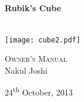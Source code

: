 \begin{titlepage}
\begin{center}


\HRule \\[0.4cm]
{ \huge \bfseries Rubik's Cube \\[0.4cm] }
\HRule \\[0.5cm]
\begin{center}
\texttt{[image: cube2.pdf]}~
\end{center}
\textsc{\LARGE  Owner's Manual}\\[1.5cm]




Nakul Joshi

\vfill

{\large 24\textsuperscript{th} October, 2013}

\end{center}
\end{titlepage}